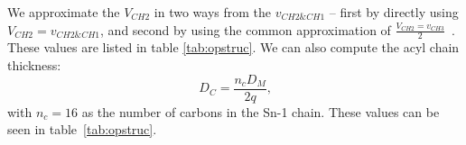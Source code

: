 We approximate the $V_{CH2}$ in two ways from the $v_{CH2\&CH1}$ -- first by directly using $V_{CH2}=v_{CH2\&CH1}$, and
second by using the common approximation of $\frac{V_{CH2}=v_{CH3}}{2}$~\cite{nagle:2000}.
These values are listed in table \ref{tab:opstruc}. We can also compute the acyl chain thickness:
\begin{equation}
   D_C = \frac{n_cD_M}{2q}\text{,}
\end{equation}
with $n_c=16$ as the number of carbons in the Sn-1 chain.
These values can be seen in table~\ref{tab:opstruc}.

